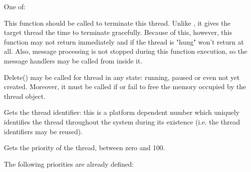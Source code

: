 
One of:

\twocolwidtha{7cm}
\begin{twocollist}\itemsep=0pt
\end{twocollist}

\label{wxthreaddelete}


This function should be called to terminate this thread. Unlike , it
gives the target thread the time to terminate gracefully. Because of this, however, this function
may not return immediately and if the thread is "hung" won't return at all. Also, message processing
is not stopped during this function execution, so the message handlers may be called from inside
it.

Delete() may be called for thread in any state: running, paused or even not yet created. Moreover,
it must be called if  or  fail to free
the memory occupied by the thread object.

\label{wxthreadgetid}


Gets the thread identifier: this is a platform dependent number which uniquely identifies the
thread throughout the system during its existence (i.e. the thread identifiers may be reused).

\label{wxthreadgetpriority}


Gets the priority of the thread, between zero and 100.

The following priorities are already defined:

\twocolwidtha{7cm}
\begin{twocollist}\itemsep=0pt
\end{twocollist}

\label{wxthreadisalive}

